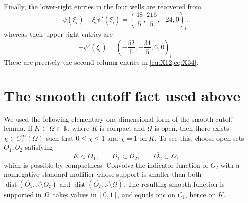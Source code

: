 \documentclass[11pt,reqno]{amsart}
\theoremstyle{definition}
\newcommand{\R}{\mathbb{R}}
\begin{document}
Finally, the lower-right entries in the four wells are recovered from
\begin{equation}
  \psi(\xi_i)-\xi_i\psi'(\xi_i)
  =\left(\frac{48}{5},\frac{216}{5},-24,0\right)_i,
\end{equation}
whereas their upper-right entries are
\begin{equation}
  -\psi'(\xi_i)
  =\left(-\frac{52}{5},-\frac{34}{5},6,0\right)_i.
\end{equation}
These are precisely the second-column entries in
\cref{eq:X12,eq:X34}.

\section{The smooth cutoff fact used above}
\label{app:cutoff}

We used the following elementary one-dimensional form of the smooth cutoff
lemma.  If $K\subset\Omega\subset\R$, where $K$ is compact and $\Omega$ is
open, then there exists $\chi\in C_c^\infty(\Omega)$ such that
$0\le\chi\le1$ and $\chi=1$ on $K$.  To see this, choose open sets
$O_1,O_2$ satisfying
\begin{equation}
  K\subset O_1,
  \qquad
  \overline{O_1}\subset O_2,
  \qquad
  \overline{O_2}\subset\Omega,
\end{equation}
which is possible by compactness.  Convolve the indicator function of $O_2$
with a nonnegative standard mollifier whose support is smaller than both
$\operatorname{dist}(\overline{O_1},\R\setminus O_2)$ and
$\operatorname{dist}(\overline{O_2},\R\setminus\Omega)$.  The resulting
smooth function is supported in $\Omega$, takes values in $[0,1]$, and equals
one on $O_1$, hence on $K$.
\end{document}
